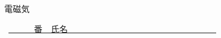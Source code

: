 \documentclass[a4paper,9pt]{jsarticle}
\begin{document}
\hakosyokika
\begin{center}
{\Large 電磁気}
\end{center}
\hfill ~\underline{~~~~~~番　氏名~~~~~~~~~~~~~~~~~~~~~~~~~~~~~~~~~~~}
\hakosyokika
\begin{enumerate}
%  
%  
%  
%  
%  
% 
% 
% 
% 
% 
% 
% 
% 
% 
% 
% 
% 
% 
% 
% 
% 
% 
% 
% 
% 
% 
% 
% 
% 
% 
% 
% 
% 
% 
% 
\setcounter{enumi}{134}

\vfill

\vfill
\newpage

\vfill

\vfill
\end{enumerate}
\end{document}
